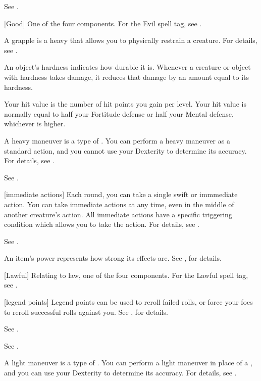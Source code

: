  See .

[Good] One of the four  components. For the Evil spell tag, see .

 A grapple is a heavy  that allows you to physically restrain a creature.
For details, see .

 An object's hardness indicates how durable it is.
Whenever a creature or object with hardness takes damage, it reduces that damage by an amount equal to its hardness.

 Your hit value is the number of hit points you gain per level.
Your hit value is normally equal to half your Fortitude defense or half your Mental defense, whichever is higher.

 A heavy maneuver is a type of .
You can perform a heavy maneuver as a standard action, and you cannot use your Dexterity to determine its accuracy.
For details, see .

 See .

[immediate actions] Each round, you can take a single swift or immmediate action.
You can take immediate actions at any time, even in the middle of another creature's action.
All immediate actions have a specific triggering condition which allows you to take the action.
For details, see .

 See .

 An item's power represents how strong its effects are.
See , for details.

[Lawful] Relating to law, one of the four  components. For the Lawful spell tag, see .

[legend points] Legend points can be used to reroll failed rolls, or force your foes to reroll successful rolls against you. See , for details.

 See .

 See .

 A light maneuver is a type of .
You can perform a light maneuver in place of a , and you can use your Dexterity to determine its accuracy.
For details, see .

